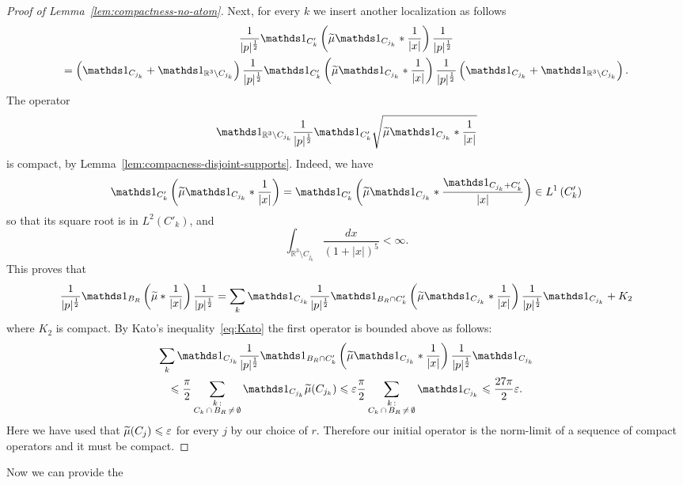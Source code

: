 \documentclass[AHL,Unicode,published]{cedram}
\newcommand{\R}{\mathbb{R}}
\newcommand\1{{\ensuremath {\mathds 1} }}
\newcommand{\ii}{\infty}
\renewcommand{\leq}{\leqslant}
\renewcommand{\tilde}{\widetilde}
\newcommand{\eps}{\varepsilon}
\let\oldtilde\tilde
\renewcommand*{\tilde}[1]{\mathchoice{\widetilde{#1}}{\widetilde{#1}}{\oldtilde{#1}}{\oldtilde{#1}}}
\begin{document}
\begin{proof}[Proof of Lemma~\ref{lem:compactness-no-atom}]
Next, for every $k$ we insert another localization as follows
\begin{multline*}
\frac1{|p|^{\frac12}}\1_{C'_{k}}\left(\tilde\mu\1_{C_{j_k}}\ast\frac1{|x|}\right)\frac1{|p|^{\frac12}}\\
=\left(\1_{C_{j_k}}+\1_{\R^3\setminus C_{j_k}}\right)\frac1{|p|^{\frac12}}\1_{C'_{k}}\left(\tilde\mu\1_{C_{j_k}}\ast\frac1{|x|}\right)\frac1{|p|^{\frac12}} \left(\1_{C_{j_k}}+\1_{\R^3\setminus C_{j_k}}\right).
\end{multline*}
The operator
\[
\1_{\R^3\setminus C_{j_k}}\frac1{|p|^{\frac12}}\1_{C'_k}\sqrt{\tilde\mu\1_{C_{j_k}}\ast\frac1{|x|}}
\]
is compact, by Lemma~\ref{lem:compacness-disjoint-supports}. Indeed, we have
\[
\1_{C'_k}\left(\tilde\mu\1_{C_{j_k}}\ast\frac1{|x|}\right)=\1_{C'_k}\left(\tilde\mu\1_{C_{j_k}}\ast\frac{\1_{C_{j_k}+C'_k}}{|x|}\right)\in L^1\left(C'_k\right)
\]
so that its square root is in $L^2(C'_k)$, and
\[
\int_{\R^3\setminus C_{j_k}}\frac{dx}{(1+|x|)^{5}}<\ii.
\]
This proves that
\[
\frac1{|p|^{\frac12}}\1_{B_R}\left(\tilde\mu\ast\frac1{|x|}\right)\frac1{|p|^{\frac12}}=\sum_{k}\1_{C_{j_k}}\frac1{|p|^{\frac12}}\1_{B_R\cap C'_k}\left(\tilde\mu\1_{C_{j_k}}\ast\frac1{|x|}\right)\frac1{|p|^{\frac12}}\1_{C_{j_k}}+K_2
\]
where $K_2$ is compact. By Kato's inequality~\eqref{eq:Kato} the first operator is bounded above as follows:
\begin{multline*}
\sum_{k}\1_{C_{j_k}}\frac1{|p|^{\frac12}}\1_{B_R\cap C'_k}\left(\tilde\mu\1_{C_{j_k}}\ast\frac1{|x|}\right)\frac1{|p|^{\frac12}}\1_{C_{j_k}}\\
\leq \frac\pi2 \sum_{\substack{k\, :\\ C_k\,\cap\,B_R\,\neq\,\emptyset}}\1_{C_{j_k}}\tilde\mu(C_{j_k})\leq \eps\frac\pi2 \sum_{\substack{k\,:\\ C_k\,\cap\,B_R\,\neq\,\emptyset}}\1_{C_{j_k}}\leq \frac{27\pi}2 \eps.
\end{multline*}
Here we have used that $\tilde\mu(C_j)\leq\eps$ for every $j$ by our choice of $r$. Therefore our initial operator is the norm-limit of a sequence of compact operators and it must be compact.
\end{proof}

Now we can provide the
\end{document}
